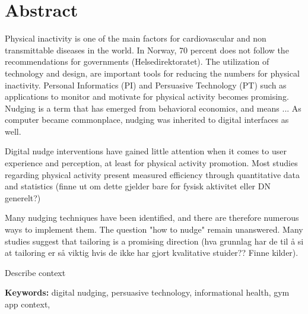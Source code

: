 \chapter*{Abstract}

Physical inactivity is one of the main factors for cardiovascular and non transmittable diseases in the world. In Norway, 70 percent does not follow the recommendations for governments (Helsedirektoratet). The utilization of technology and design, are important tools for reducing the numbers for physical inactivity. Personal Informatics (PI) and Persuasive Technology (PT) such as applications to monitor and motivate for physical activity becomes promising. Nudging is a term that has emerged from behavioral economics, and means ... As computer became commonplace, nudging was inherited to digital interfaces as well.  

 Digital nudge interventions have gained little attention when it comes to  user experience and perception, at least for physical activity promotion. Most studies regarding physical activity present measured efficiency through quantitative data and statistics (finne ut om dette gjelder bare for fysisk aktivitet eller DN generelt?)

Many nudging techniques have been identified, and there are therefore numerous ways to implement them. The question "how to nudge" remain unanswered. Many studies suggest that tailoring is a promising direction (hva grunnlag har de til å si at tailoring er så viktig hvis de ikke har gjort kvalitative stuider?? Finne kilder).

Describe context


\textbf{Keywords:} digital nudging, persuasive technology, informational health, gym app context, 